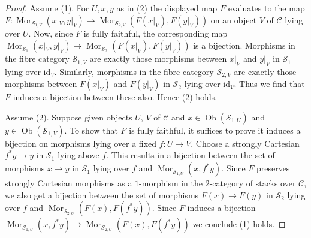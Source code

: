 \documentclass{stacks-project}
\theoremstyle{plain}
\theoremstyle{definition}
\theoremstyle{remark}
\numberwithin{equation}{subsection}
\def\Mor{\mathop{\mathrm{Mor}}\nolimits}
\def\Ob{\mathop{\mathrm{Ob}}\nolimits}
\begin{document}
\begin{proof}
Assume (1). For $U, x, y$ as in (2) the displayed map $F$ evaluates to the map
$F : \Mor_{\mathcal{S}_{1, V}}(x|_V, y|_V) \to
\Mor_{\mathcal{S}_{2, V}}(F(x|_V), F(y|_V))$
on an object $V$ of $\mathcal{C}$ lying over $U$.
Now, since $F$ is fully faithful, the corresponding map
$\Mor_{\mathcal{S}_1}(x|_V, y|_V) \to \Mor_{\mathcal{S}_2}(F(x|_V), F(y|_V))$
is a bijection. Morphisms in the fibre category $\mathcal{S}_{1, V}$ are
exactly those morphisms between $x|_V$ and $y|_V$ in $\mathcal{S}_1$ lying
over $\text{id}_V$. Similarly, morphisms in the fibre category
$\mathcal{S}_{2, V}$ are exactly those morphisms between $F(x|_V)$ and
$F(y|_V)$ in $\mathcal{S}_2$ lying over $\text{id}_V$. Thus we find that $F$
induces a bijection between these also. Hence (2) holds.

\medskip\noindent
Assume (2). Suppose given objects $U$, $V$ of $\mathcal{C}$ and
$x \in \Ob(\mathcal{S}_{1, U})$ and
$y \in \Ob(\mathcal{S}_{1, V})$. To show that $F$ is fully faithful,
it suffices to prove it induces a bijection on
morphisms lying over a fixed $f : U \to V$. Choose a strongly Cartesian
$f^*y \to y$ in $\mathcal{S}_1$ lying above $f$. This results in a
bijection between the set of morphisms $x \to y$ in $\mathcal{S}_1$ lying
over $f$ and $\Mor_{\mathcal{S}_{1, U}}(x, f^*y)$. Since $F$ preserves
strongly Cartesian morphisms as a $1$-morphism in the $2$-category
of stacks over $\mathcal{C}$, we also get a bijection
between the set of morphisms $F(x) \to F(y)$ in $\mathcal{S}_2$ lying
over $f$ and $\Mor_{\mathcal{S}_{2, U}}(F(x), F(f^*y))$.
Since $F$ induces a bijection
$\Mor_{\mathcal{S}_{1, U}}(x, f^*y) \to
\Mor_{\mathcal{S}_{2, U}}(F(x), F(f^*y))$
we conclude (1) holds.
\end{proof}
\end{document}
